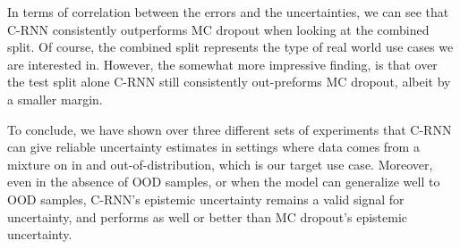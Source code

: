 \documentclass[../main.tex]{subfiles}
\begin{document}
In terms of correlation between the errors and the uncertainties, we can see that C-RNN consistently outperforms MC dropout when looking at the combined split. Of course, the combined split represents the type of real world use cases we are interested in. However, the somewhat more impressive finding, is that over the test split alone C-RNN still consistently out-preforms MC dropout, albeit by a smaller margin.  

To conclude, we have shown over three different sets of experiments that C-RNN can give reliable uncertainty estimates in settings where data comes from a mixture on in and out-of-distribution, which is our target use case. Moreover, even in the absence of OOD samples, or when the model can generalize well to OOD samples, C-RNN's epistemic uncertainty remains a valid signal for uncertainty, and performs as well or better than MC dropout's epistemic uncertainty. 
\end{document}

